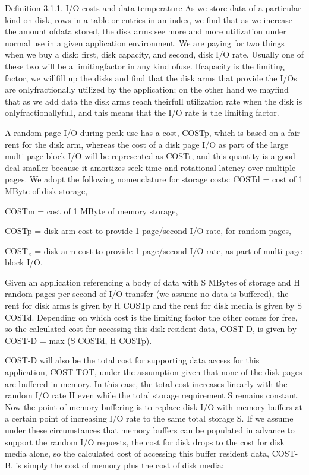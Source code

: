 \documentclass[a4paper,11pt,notitlepage,twoside,openright]{article}
\begin{document}
Definition 3.1.1. I/O costs and data temperature As we store data of a
particular kind on disk, rows in a table or entries in an index, we find
that as we increase the amount ofdata stored, the disk arms see more and
more utilization under normal use in a given application environment. We
are paying for two things when we buy a disk: first, disk capacity, and
second, disk I/O rate. Usually one of these two will be a limitingfactor
in any kind ofuse. Ifcapacity is the limiting factor, we willfill up the
disks and find that the disk arms that provide the I/Os are
onlyfractionally utilized by the application; on the other hand we
mayfind that as we add data the disk arms reach theirfull utilization
rate when the disk is onlyfractionallyfull, and this means that the I/O
rate is the limiting factor.

A random page I/O during peak use has a cost, COSTp, which is based on a
fair rent for the disk arm, whereas the cost of a disk page I/O as part
of the large multi-page block I/O will be represented as COSTr, and this
quantity is a good deal smaller because it amortizes seek time and
rotational latency over multiple pages. We adopt the following
nomenclature for storage costs: COSTd = cost of 1 MByte of disk storage,

COSTm = cost of 1 MByte of memory storage,

COSTp = disk arm cost to provide 1 page/second I/O rate, for random
pages,

COST„ = disk arm cost to provide 1 page/second I/O rate, as part of
multi-page block I/O.

Given an application referencing a body of data with S MBytes of storage
and H random pages per second of I/O transfer (we assume no data is
buffered), the rent for disk arms is given by H COSTp and the rent for
disk media is given by S COSTd. Depending on which cost is the limiting
factor the other comes for free, so the calculated cost for accessing
this disk resident data, COST-D, is given by COST-D = max (S COSTd, H
COSTp).

COST-D will also be the total cost for supporting data access for this
application, COST-TOT, under the assumption given that none of the disk
pages are buffered in memory. In this case, the total cost increases
linearly with the random I/O rate H even while the total storage
requirement S remains constant. Now the point of memory buffering is to
replace disk I/O with memory buffers at a certain point of increasing
I/O rate to the same total storage S. If we assume under these
circumstances that memory buffers can be populated in advance to support
the random I/O requests, the cost for disk drops to the cost for disk
media alone, so the calculated cost of accessing this buffer resident
data, COST-B, is simply the cost of memory plus the cost of disk media:
\end{document}
